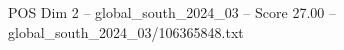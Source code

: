 \begin{textsample}{POS Dim 2 – global\_south\_2024\_03 – Score 27.00 – global\_south\_2024\_03/106365848.txt}
\end{textsample}
